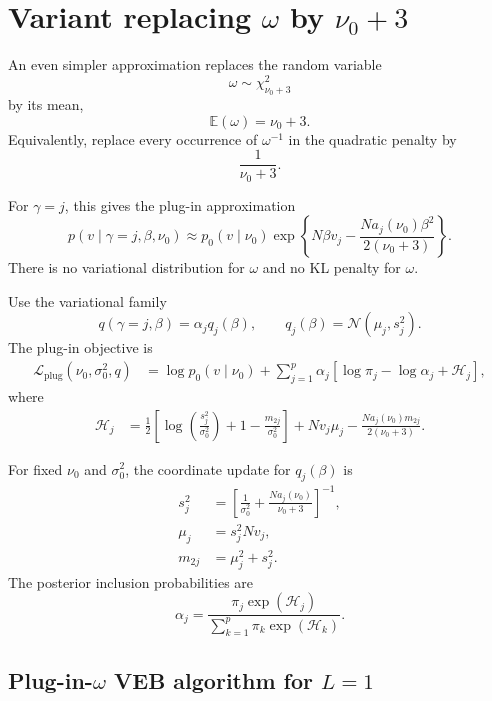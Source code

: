 \documentclass[11pt]{article}
\newcommand{\nuo}{\nu_0}
\newcommand{\sigb}{\sigma_0^2}
\newcommand{\E}{\mathbb E}
\newcommand{\Normal}{\mathcal N}
\newcommand{\chisq}{\chi^2}
\begin{document}
\section{Variant replacing \(\omega\) by \(\nuo+3\)}

An even simpler approximation replaces the random variable
\[
\omega\sim\chisq_{\nuo+3}
\]
by its mean,
\[
\E(\omega)=\nuo+3.
\]
Equivalently, replace every occurrence of \(\omega^{-1}\) in the quadratic penalty by
\[
\frac{1}{\nuo+3}.
\]

For \(\gamma=j\), this gives the plug-in approximation
\[
p(v\mid \gamma=j,\beta,\nuo)
\approx
p_0(v\mid\nuo)
\exp\left\{
N\beta v_j
-
\frac{N a_j(\nuo)\beta^2}{2(\nuo+3)}
\right\}.
\]
There is no variational distribution for \(\omega\) and no KL penalty for \(\omega\).

Use the variational family
\[
q(\gamma=j,\beta)
=
\alpha_j q_j(\beta),
\qquad
q_j(\beta)=\Normal(\mu_j,s_j^2).
\]
The plug-in objective is
\begin{align}
\mathcal L_{\mathrm{plug}}(\nuo,\sigb,q)
&=
\log p_0(v\mid\nuo)
+
\sum_{j=1}^p
\alpha_j
\left[
\log \pi_j
-
\log \alpha_j
+
\mathcal H_j
\right],
\end{align}
where
\begin{align}
\mathcal H_j
&=
\frac12
\left[
\log\left(\frac{s_j^2}{\sigb}\right)
+
1
-
\frac{m_{2j}}{\sigb}
\right]
+
Nv_j\mu_j
-
\frac{N a_j(\nuo)m_{2j}}{2(\nuo+3)}.
\end{align}

For fixed \(\nuo\) and \(\sigb\), the coordinate update for \(q_j(\beta)\) is
\begin{align}
s_j^2
&=
\left[
\frac{1}{\sigb}
+
\frac{N a_j(\nuo)}{\nuo+3}
\right]^{-1},
\\
\mu_j
&=
s_j^2Nv_j,
\\
m_{2j}
&=
\mu_j^2+s_j^2.
\end{align}
The posterior inclusion probabilities are
\[
\alpha_j
=
\frac{
\pi_j\exp(\mathcal H_j)
}{
\sum_{k=1}^p
\pi_k\exp(\mathcal H_k)
}.
\]

\subsection*{Plug-in-\(\omega\) VEB algorithm for \(L=1\)}
\end{document}
